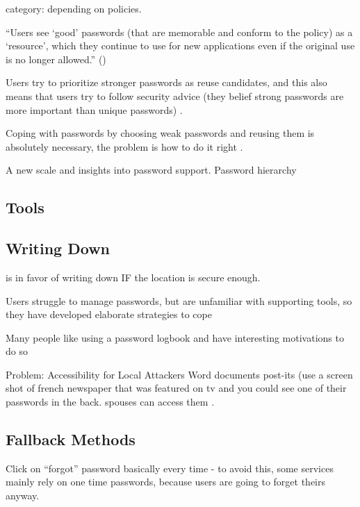 	category: depending on policies. \cite{Stobert2014PasswordLifeCycle}
	
	
	``Users see `good' passwords (that are memorable and conform to the policy) as a `resource', which they continue to use for new applications even if the original use is no longer allowed.'' (\cite{Inglesant2010TrueCostOfUnusablePolicies})
	
	Users try to prioritize stronger passwords as reuse candidates, and this also means that users try to follow security advice (they belief strong passwords are more important than unique passwords) \cite{Wash2016UnderstandingPasswordChoices}.
	
	Coping with passwords by choosing weak passwords and reusing them is absolutely necessary, the problem is how to do it right \cite{Florencio2014PasswordPortfoliosFiniteUser}.
	
	A new scale and insights into password support. Password hierarchy \cite{Haque2015PhdProposal}
	
	\subsection{Tools}
	
	\subsection{Writing Down}
	\cite{Herley2012PersistenceOfPasswords} is in favor of writing down IF the location is secure enough.
	
	Users struggle to manage passwords, but are unfamiliar with supporting tools, so they have developed elaborate strategies to cope \cite{Stobert2014Agony}
	
	Many people like using a password logbook and have interesting motivations to do so \cite{Kothari2017PasswordLogbooks}
	
	\cite{Conklin2004PWAuthenticationSystemPerspective}
	
	Problem: Accessibility for Local Attackers
Word documents post-its (use a screen shot of french newspaper that was featured on tv and you could see one of their passwords in the back. spouses can access them .	


	\subsection{Fallback Methods}
	Click on ``forgot'' password basically every time - to avoid this, some services mainly rely on one time passwords, because users are going to forget theirs anyway. 

